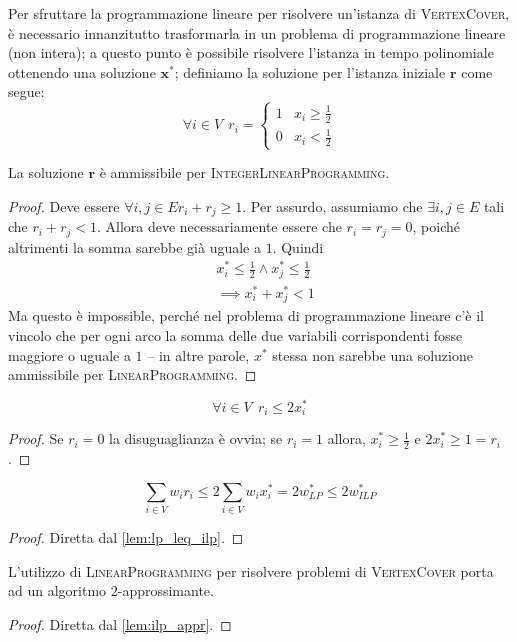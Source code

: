 Per sfruttare la programmazione lineare per risolvere un'istanza di
\textsc{VertexCover}, è necessario innanzitutto trasformarla in un problema
di programmazione lineare (non intera); a questo punto è possibile
risolvere l'istanza in tempo polinomiale ottenendo una soluzione $\mathbf{x}^*$;
definiamo la soluzione per l'istanza iniziale $\mathbf{r}$ come segue:
$$
	\forall i \in V ~~  r_i =
	\begin{cases}
		1 & x_i \geq \frac{1}{2} \\
		0 & x_i < \frac{1}{2}
	\end{cases}
$$
\begin{lemma}\label{lem:ilp_r_ammiss}
	La soluzione $\mathbf{r}$ è ammissibile per \textsc{IntegerLinearProgramming}.
\end{lemma}
\begin{proof}
	Deve essere $\forall i, j \in E r_i+r_j \geq 1$.
	Per assurdo, assumiamo che $\exists i, j \in E$ tali che $r_i + r_j < 1$.
	Allora deve necessariamente essere che $r_i = r_j = 0$, poiché altrimenti
	la somma sarebbe già uguale a $1$. Quindi
	\begin{align*}
		 & x_i^* \leq \frac{1}{2} \land x_j^* \leq \frac{1}{2} \\
		 & \implies x_i^* +x_j^* < 1
	\end{align*}
	Ma questo è impossible, perché nel problema di programmazione lineare
	c'è il vincolo che per ogni arco la somma delle due variabili
	corrispondenti fosse maggiore o uguale a $1$ -- in altre parole,
	$x^*$ stessa non sarebbe una soluzione ammissibile per \textsc{LinearProgramming}.
\end{proof}
\begin{lemma} \label{lem:ilp_r_i_leq_2_x_i}
	$$ \forall i \in V ~~ r_i \leq 2x_i^*$$
\end{lemma}
\begin{proof}
	Se $r_i = 0$ la disuguaglianza è ovvia;
	se $r_i  = 1$ allora, $x^*_i \geq \frac{1}{2}$  e $2x_i^* \geq 1 = r_i$.
\end{proof}
\begin{lemma}\label{lem:ilp_appr}
	$$
		\sum_{i \in V} w_i r_i \leq 2 \sum_{i \in V} w_i x_i^* = 2w^*_{LP} \leq 2w^*_{ILP}
	$$
\end{lemma}
\begin{proof}
	Diretta dal \cref{lem:lp_leq_ilp}.
\end{proof}
\begin{theorem}
	L'utilizzo di \textsc{LinearProgramming} per risolvere problemi di \textsc{VertexCover}
	porta ad un algoritmo $2$-approssimante.
\end{theorem}
\begin{proof}
	Diretta dal \cref{lem:ilp_appr}.
\end{proof}

